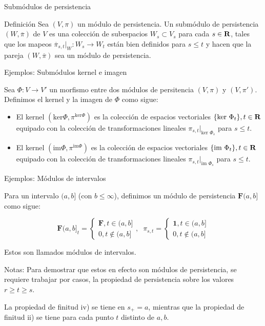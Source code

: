 \documentclass{beamer}
\def\R\re
\def \R{{\bf R}}
\def \re{{\mathbb R}}
\begin{document}
\begin{frame}{Submódulos de persistencia}

\begin{block}{Definición}
Sea $(V, \pi)$ un módulo de persistencia. Un submódulo de persistencia $(W,\overline{\pi})$ de $V$ es una colección de subespacios $W_s\subset V_s$ para cada $s\in\R$, tales que los mapeos $\overline{\pi}_{s,t}|_W:W_s\rightarrow W_t$ están bien definidos para $s\leq t$ y hacen que la pareja $(W,\overline{\pi})$ sea un módulo de persistencia.
    
\end{block}
    
\end{frame}


\begin{frame}{Ejemplos: Submódulos kernel e imagen}

Sea $\Phi:V\rightarrow V'$ un morfismo entre dos módulos de persitencia $(V,\pi)$ y $(V,\pi')$. Definimos el kernel y la imagen de $\Phi$ como sigue: 
\pause

\begin{itemize}
    \item El kernel $(\text{ker} \Phi, \pi^{\text{ker} \Phi})$ es la colección de espacios vectoriales $\{\text{ker }\Phi_t\}, t\in\R$ equipado con la colección de transformaciones lineales $\pi_{s,t}|_{\text{ker }\Phi_s}$ para $s\leq t$.
\pause
    \item El kernel $(\text{im} \Phi, \pi^{\text{im} \Phi})$ es la colección de espacios vectoriales $\{\text{im }\Phi_t\}, t\in\R$ equipado con la colección de transformaciones lineales $\pi_{s,t}|_{\text{im }\Phi_s}$ para $s\leq t$.
\end{itemize}
    
\end{frame}

\begin{frame}{Ejemplos: Módulos de intervalos}

Para un intervalo $(a,b]$ (con $b\leq \infty$), definimos un módulo de persistencia $\mathbf{F}(a,b]$ como sigue:

$$\mathbf{F}(a,b]_t=\begin{cases}
\mathbf{F}, t\in (a,b]\\
0, t\notin (a,b]
\end{cases}, \;\;
\pi_{s,t}=\begin{cases}
\mathbf{1}, t\in (a,b]\\
0, t\notin (a,b]
\end{cases}$$

Estos son llamados módulos de intervalos. 
\pause

\begin{block}{Notas:}
    Para demostrar que estos en efecto son módulos de persistencia, se requiere trabajar por casos, la propiedad de persistencia sobre los valores $r\geq t\geq s$.
    
    La propiedad de finitud iv) se tiene en $s_+=a$, mientras que la propiedad de finitud ii) se tiene para cada punto $t$ distinto de $a, b$.
    
\end{block}

\end{frame}
\end{document}
